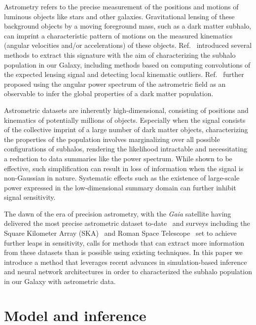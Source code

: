 \documentclass[]{article}
\begin{document}
Astrometry refers to the precise measurement of the positions and motions of luminous objects like stars and other galaxies. Gravitational lensing of these background objects by a moving foreground mass, such as a dark matter subhalo, can imprint a characteristic pattern of motions on the measured kinematics (angular velocities and/or accelerations) of these objects. Ref.~\cite{VanTilburg:2018ykj} introduced several methods to extract this signature with the aim of characterizing the subhalo population in our Galaxy, including methods based on computing convolutions of the expected lensing signal and detecting local kinematic outliers. Ref.~\cite{Mishra-Sharma:2020ynk} further proposed using the angular power spectrum of the astrometric field as an observable to infer the global properties of a dark matter population.

Astrometric datasets are inherently high-dimensional, consisting of positions and kinematics of potentially millions of objects. Especially when the signal consists of the collective imprint of a large number of dark matter objects, characterizing the properties of the population involves marginalizing over all possible configurations of subhalos, rendering the likelihood intractable and necessitating a reduction to data summaries like the power spectrum. While shown to be effective, such simplification can result in loss of information when the signal is non-Gaussian in nature. Systematic effects such as the existence of large-scale power expressed in the low-dimensional summary domain can further inhibit signal sensitivity. 

The dawn of the era of precision astrometry, with the \emph{Gaia} satellite having delivered the most precise astrometric dataset to-date~\cite{2016A&A...595A...1G,2018A&A...616A...1G,2018A&A...616A...2L} and surveys including the Square Kilometer Array (SKA)~\cite{Fomalont:2004hr,Jarvis:2015tqa} and Roman Space Telescope~\cite{2019JATIS...5d4005W} set to achieve further leaps in sensitivity, calls for methods that can extract more information from these datasets than is possible using existing techniques. In this paper we introduce a method that leverages recent advances in simulation-based inference and neural network architectures in order to characterized the subhalo population in our Galaxy with astrometric data.



\section{Model and inference}
\label{sec:model}
\end{document}
